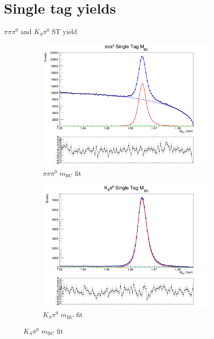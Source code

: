 \documentclass{beamer}
\begin{document}
\section{Single tag yields}
\begin{frame}{$\pi\pi\pi^0$ and $K_S\pi^0$ ST yield}
  \begin{figure}
    \centering
    \begin{subfigure}{0.5\textwidth}
      \centering
      \includegraphics[width=\textwidth]{pipipi0SingleTagMBCPlot.png}
      \caption{$\pi\pi\pi^0$ $m_\text{BC}$ fit}
    \end{subfigure}%
    \begin{subfigure}{0.5\textwidth}
      \centering
      \includegraphics[width=\textwidth]{KSpi0SingleTagMBCPlot.png}
      \caption{$K_S\pi^0$ $m_\text{BC}$ fit}
    \end{subfigure}
  \end{figure}
\end{frame}
\end{document}
